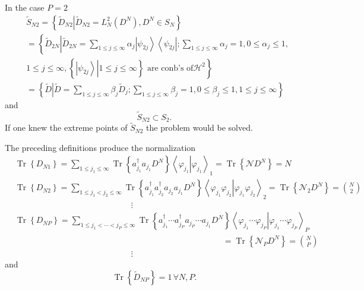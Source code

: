 \documentclass[aps,preprint]{revtex4}%
\begin{document}
In the case $P=2$
\begin{align}
&  \tilde{S}_{N2}=\left\{  \left.  \tilde{D}_{N2}\right\vert \tilde{D}%
_{N2}=L_{N}^{2}\left(  D^{N}\right)  ,D^{N}\in S_{N}\right\} \nonumber\\
&  =\left\{  \tilde{D}_{2N}\left\vert \tilde{D}_{2N}=\sum_{1\leq j\leq\infty
}\alpha_{j}\left\vert \psi_{2j}\right\rangle \left\langle \psi_{2j}\right\vert
;\sum_{1\leq j\leq\infty}\alpha_{j}=1,0\leq\alpha_{j}\leq1,\right.  \right.
\nonumber\\
&  \left.  1\leq j\leq\infty,\left\{  \left.  \left\vert \psi_{2j}%
\right\rangle \right\vert 1\leq j\leq\infty\right\}  \text{ are conb's of
}\mathcal{H}^{2}\right\} \nonumber\\
&  =\left\{  \tilde{D}\left\vert \tilde{D}=\sum_{1\leq j\leq\infty}\beta
_{j}\tilde{D}_{j};\sum_{1\leq j\leq\infty}\beta_{j}=1,0\leq\beta_{j}%
\leq1,1\leq j\leq\infty\right.  \right\}
\end{align}
and
\begin{equation}
\tilde{S}_{N2}\subset S_{2}.
\end{equation}
If one knew the extreme points of $\tilde{S}_{N2}$ the problem would be solved.

The preceding definitions produce the normalization
\begin{align}
&  \operatorname{Tr}\left\{  D_{N1}\right\}  =\sum_{1\leq j_{1}\leq\infty
}\operatorname{Tr}\left\{  a_{j_{1}}^{\dagger}a_{j_{1}}D^{N}\right\}  \text{
}\left\langle \left.  \varphi_{j_{1}}\right\vert \varphi_{j_{1}}\right\rangle
_{1}=\operatorname{Tr}\left\{  \mathcal{N}D^{N}\right\}  =N\nonumber\\
&  \operatorname{Tr}\left\{  D_{N2}\right\}  =\sum_{1\leq j_{1}<j_{2}%
\leq\infty}\operatorname{Tr}\left\{  a_{j_{1}}^{\dagger}a_{j_{2}}^{\dagger
}a_{j_{2}}a_{j_{1}}D^{N}\right\}  \left\langle \left.  \varphi_{j_{1}}%
\varphi_{j_{2}}\right\vert \varphi_{j_{1}}\varphi_{j_{2}}\right\rangle
_{2}=\operatorname{Tr}\left\{  \mathcal{N}_{2}D^{N}\right\}  =\binom{N}%
{2}\nonumber\\
&  \qquad\qquad\qquad\quad\qquad\qquad\qquad\quad\vdots\nonumber\\
&  \operatorname{Tr}\left\{  D_{NP}\right\}  =\sum_{1\leq j_{1}<\cdots
<j_{P}\leq\infty}\operatorname{Tr}\left\{  a_{j_{1}}^{\dagger}\cdots a_{j_{P}%
}^{\dagger}a_{j_{P}}\cdots a_{j_{1}}D^{N}\right\}  \left\langle \left.
\varphi_{j_{1}}\cdots\varphi_{j_{P}}\right\vert \varphi_{j_{1}}\cdots
\varphi_{j_{P}}\right\rangle _{P}\nonumber\\
&  \qquad\qquad\qquad\qquad\qquad\qquad\qquad\qquad\qquad\qquad\qquad
\qquad\quad\left.  =\right.  \operatorname{Tr}\left\{  \mathcal{N}_{P}%
D^{N}\right\}  =\binom{N}{P}\nonumber\\
&  \qquad\qquad\qquad\quad\qquad\qquad\qquad\quad\vdots
\end{align}
and
\begin{equation}
\operatorname{Tr}\left\{  \tilde{D}_{NP}\right\}  =1\,\forall N,P.
\end{equation}
\end{document}
